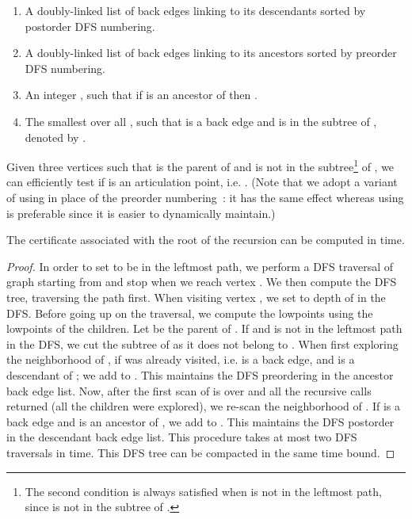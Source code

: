 \begin{enumerate}
	\setlength{\itemsep}{0pt} 
	\item A doubly-linked list  of back edges linking 
          to its descendants  sorted by postorder DFS numbering.
	\item A doubly-linked list  of back edges linking 
          to its ancestors  sorted by preorder DFS numbering.
        \item \label{item:point3} An integer , such that if  is an
                ancestor of  then .
	\item \label{item:point4} The smallest  over all
          , such that  is a back edge and  is in the
          subtree of , denoted by .
\end{enumerate}

Given three vertices  such that  is the parent of 
and  is not in the subtree\footnote{The second condition is always
  satisfied when  is not in the leftmost path, since  is not in
  the subtree of .} of , we can efficiently test if  is an
articulation point, i.e.\mbox{} . (Note that we adopt a variant of  using
 in place of the preorder numbering~\cite{Tarjan72}: it has
the same effect whereas using  is preferable since it is
easier to dynamically maintain.)

\begin{lemma}
  \label{lem:certificate_scratch}
 The certificate associated with the root of the recursion can be
 computed in  time.
\end{lemma}

\begin{proof}
	In order to set  to be in the leftmost path, we perform a
        DFS traversal of graph  starting from  and stop when we
        reach vertex . We then compute the DFS tree, traversing the
        path  first. When visiting vertex , we set
         to depth of  in the DFS. Before going up on the
        traversal, we compute the lowpoints using the lowpoints of the
        children. Let  be the parent of . If
         and  is not in the
        leftmost path in the DFS, we cut the subtree of  as it does
        not belong to .  When first exploring the
        neighborhood of , if  was already visited,
        i.e.  is a back edge, and  is a descendant of ;
        we add  to . This maintains the DFS preordering in
        the ancestor back edge list. Now, after the first scan of
         is over and all the recursive calls returned (all the
        children were explored), we re-scan the neighborhood of
        . If  is a back edge and  is an ancestor of
        , we add  to . This maintains the DFS
        postorder in the descendant back edge list. This procedure
        takes at most two DFS traversals in  time.  This DFS
        tree can be compacted in the same time bound.  
\end{proof}

